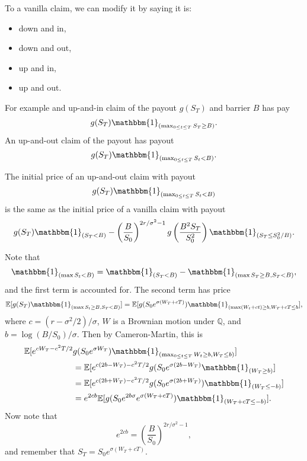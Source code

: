 \documentclass[12pt]{article}
\begin{document}
To a vanilla claim, we can modify it by saying it is:
\begin{itemize}
	\item down and in,
	\item down and out,
	\item up and in,
	\item up and out.
\end{itemize}

\begin{exbox}
	For example and up-and-in claim of the payout $g(S_T)$ and barrier $B$ has pay
	\[
	g(S_T) \mathbbm{1}_{(\max_{0 \leq t \leq T} S_T \geq B)}.
	\]
	An up-and-out claim of the payout has payout
	\[
	g(S_T) \mathbbm{1}_{(\max_{0 \leq t \leq T} S_t < B)}.
	\]
\end{exbox}

\begin{proposition}
	The initial price of an up-and-out claim with payout
	\[
	g(S_T) \mathbbm{1}_{(\max_{0 \leq t \leq T}S_t < B)}
	\]
	is the same as the initial price of a vanilla claim with payout
	\[
	g(S_T) \mathbbm{1}_{(S_T < B)} - \left( \frac{B}{S_0} \right)^{2r/\sigma^2 - 1} g\left( \frac{B^2 S_T}{S_0^2} \right) \mathbbm{1}_{(S_T \leq S_0^2/B)}.
	\]
\end{proposition}

\begin{proofbox}
	Note that
	\[
	\mathbbm{1}_{(\max S_t < B)} = \mathbbm{1}_{(S_T < B)} - \mathbbm{1}_{(\max S_T \geq B, S_T < B)},
	\]
	and the first term is accounted for. The second term has price
	\begin{align*}
		\mathbb{E}[g(S_T) \mathbbm{1}_{(\max S_t \geq B, S_T < B)}] = \mathbb{E}[g(S_0 e^{\sigma(W_T + cT)}) \mathbbm{1}_{(\max(W_t + ct) \geq b, W_T + cT \leq b}],
	\end{align*}
	where $c = (r - \sigma^2/2)/\sigma$, $W$ is a Brownian motion under $\mathbb{Q}$, and $b = \log(B/S_0)/\sigma$. Then by Cameron-Martin, this is
	\begin{align*}
		\mathbb{E}[e^{cW_T - c^2T/2} &g(S_0 e^{\sigma W_T}) \mathbbm{1}_{(\max _{0 \leq t \leq T} W_t \geq b, W_T \leq b)}] \\
					     &=  \mathbb{E}[e^{c(2b - W_T) - c^2T/2}g(S_0 e^{\sigma(2b - W_T)} \mathbbm{1}_{(W_T \geq b)}] \\
					     &= \mathbb{E}[e^{c(2b + W_T) - c^2T/2}g(S_0 e^{\sigma(2b + W_T)}) \mathbbm{1}_{(W_T \leq -b)}] \\
					     &=  e^{2c b} \mathbb{E}[g(S_0 e^{2b\sigma} e^{\sigma(W_T + cT)}) \mathbbm{1}_{(W_T + cT \leq -b)}].
	\end{align*}
	Now note that
	\[
	e^{2c b} = \left( \frac{B}{S_0} \right)^{2r/\sigma^2 - 1},
	\]
	and remember that $S_T = S_0 e^{\sigma(W_T + c T)}$.
\end{proofbox}


\newpage

\printindex
\end{document}

